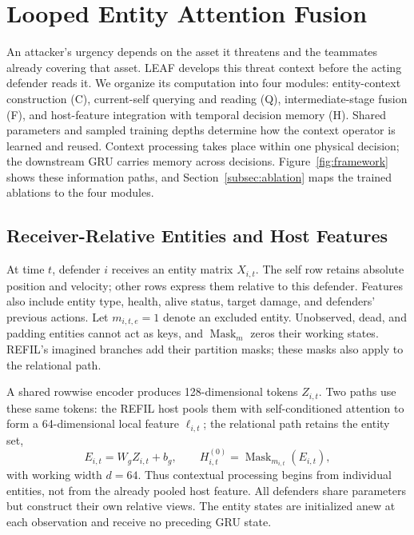 \section{Looped Entity Attention Fusion}
\label{sec:method}
An attacker's urgency depends on the asset it threatens and the teammates already covering that asset. LEAF develops this threat context before the acting defender reads it. We organize its computation into four modules: entity-context construction (C), current-self querying and reading (Q), intermediate-stage fusion (F), and host-feature integration with temporal decision memory (H). Shared parameters and sampled training depths determine how the context operator is learned and reused. Context processing takes place within one physical decision; the downstream GRU carries memory across decisions. Figure~\ref{fig:framework} shows these information paths, and Section~\ref{subsec:ablation} maps the trained ablations to the four modules.

\subsection{Receiver-Relative Entities and Host Features}
At time $t$, defender $i$ receives an entity matrix $X_{i,t}$. The self row retains absolute position and velocity; other rows express them relative to this defender. Features also include entity type, health, alive status, target damage, and defenders' previous actions. Let $m_{i,t,e}=1$ denote an excluded entity. Unobserved, dead, and padding entities cannot act as keys, and $\operatorname{Mask}_m$ zeros their working states. REFIL's imagined branches add their partition masks; these masks also apply to the relational path.

A shared rowwise encoder produces 128-dimensional tokens $Z_{i,t}$. Two paths use these same tokens: the REFIL host pools them with self-conditioned attention to form a 64-dimensional local feature $\ell_{i,t}$; the relational path retains the entity set,
\begin{equation}
 E_{i,t}=W_g Z_{i,t}+b_g,\qquad
 H^{(0)}_{i,t}=\operatorname{Mask}_{m_{i,t}}(E_{i,t}),
 \label{eq:workspace}
\end{equation}
with working width $d=64$. Thus contextual processing begins from individual entities, not from the already pooled host feature. All defenders share parameters but construct their own relative views. The entity states are initialized anew at each observation and receive no preceding GRU state.

